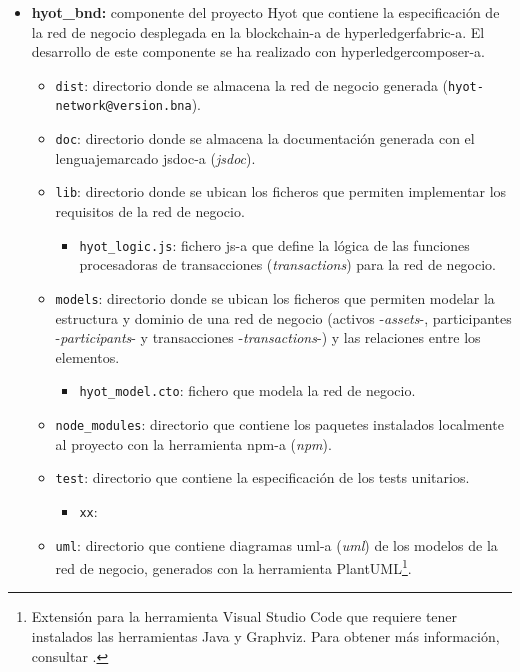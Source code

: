 \documentclass[12pt,a4paper, twoside]{report}
\begin{document}
\begin{itemize}
		\item \textbf{hyot\_bnd:} componente del proyecto Hyot que contiene la especificación de la red de negocio desplegada en la \gls{blockchain-a} de \gls{hyperledgerfabric-a}. El desarrollo de este componente se ha realizado con \gls{hyperledgercomposer-a}.
		\begin{itemize}
			\item \texttt{dist}: directorio donde se almacena la red de negocio generada (\texttt{hyot-network@version.bna}).
			\item \texttt{doc}: directorio donde se almacena la documentación generada con el \gls{lenguajemarcado} \gls{jsdoc-a} (\textit{\gls{jsdoc}}).
			\item \texttt{lib}: directorio donde se ubican los ficheros que permiten implementar los requisitos de la red de negocio.
			\begin{itemize}
				\item \texttt{hyot\_logic.js}: fichero \gls{js-a} que define la lógica de las funciones procesadoras de transacciones (\textit{\glspl{transaction}}) para la red de negocio.
			\end{itemize}
			\item \texttt{models}: directorio donde se ubican los ficheros que permiten modelar la estructura y dominio de una red de negocio (activos -\textit{\glspl{asset}}-, participantes -\textit{\glspl{participant}}- y transacciones -\textit{\glspl{transaction}}-) y las relaciones entre los elementos.		
			\begin{itemize}
				\item \texttt{hyot\_model.cto}: fichero que modela la red de negocio.
			\end{itemize}
			\item \texttt{node\_modules}: directorio que contiene los paquetes instalados localmente al proyecto con la herramienta \gls{npm-a} (\textit{\gls{npm}}).	
			\item \texttt{test}: directorio que contiene la especificación de los tests unitarios.
			\begin{itemize}
				\item \texttt{xx}: %
			\end{itemize}
			\item \texttt{uml}: directorio que contiene diagramas \gls{uml-a} (\textit{\gls{uml}}) de los modelos de la red de negocio, generados con la herramienta PlantUML\footnote{Extensión para la herramienta Visual Studio Code que requiere tener instalados las herramientas Java y Graphviz. Para obtener más información, consultar \cite{krishnan:uml}.}.

\end{itemize}
\end{itemize}
\end{document}
